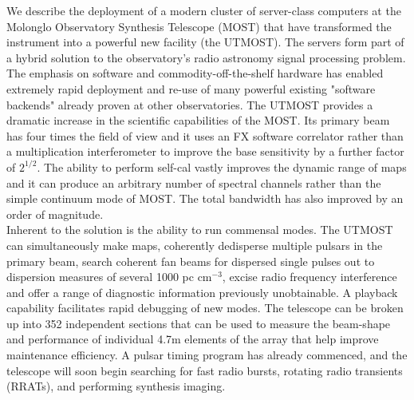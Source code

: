 We describe the deployment of a modern cluster of server-class computers at the Molonglo Observatory Synthesis Telescope (MOST) that have transformed the instrument into a powerful new facility (the UTMOST). The servers form part of a hybrid solution to the observatory's radio astronomy signal processing problem. The emphasis on software and commodity-off-the-shelf hardware has enabled extremely rapid deployment and re-use of many powerful existing "software backends" already proven at other observatories. 
The UTMOST provides a dramatic increase in the scientific capabilities of the MOST. Its primary beam has four times the field of view and it uses an FX software correlator rather than a multiplication interferometer to improve the base sensitivity by a further factor of $2^{1/2}$. The ability to perform self-cal vastly improves the dynamic range of maps and it can produce an arbitrary number of spectral channels rather than the simple continuum mode of MOST. The total bandwidth has also improved by an order of magnitude.\\ Inherent to the solution is the ability to run commensal modes. The UTMOST can simultaneously make maps, coherently dedisperse multiple pulsars in the primary beam, search coherent fan beams for dispersed single pulses out to dispersion measures of several 1000 pc cm$^{-3}$, excise radio frequency interference and offer a range of diagnostic information previously unobtainable. A playback capability facilitates rapid debugging of new modes. The telescope can be broken up into 352 independent sections that can be used to measure the beam-shape and performance of individual 4.7m elements of the array that help improve maintenance efficiency. A pulsar timing program has already commenced, and the telescope will soon begin searching for fast radio bursts, rotating radio transients (RRATs), and performing synthesis imaging. 

